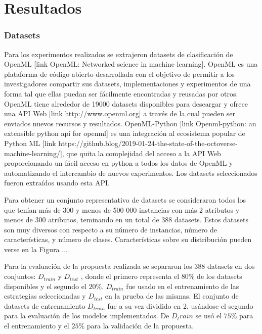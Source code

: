 \chapter{Resultados}\label{chapter:results}


\subsection{Datasets}

%
%
%

Para los experimentos realizados se extrajeron datasets de clasificación de OpenML [link OpenML: Networked science in machine learning]. OpenML es una plataforma de código abierto desarrollada con el objetivo de permitir a los investigadores compartir sus datasets, implementaciones y experimentos de una forma tal que ellas puedan ser fácilmente encontradas y reusadas por otros. OpenML tiene alrededor de 19000 datasets disponibles para descargar y ofrece una API Web [link http://www.openml.org] a través de la cual pueden ser enviados nuevos recursos y resultados. OpenML-Python [link Openml-python: an extensible python api for openml] es una integración al ecosistema popular de Python ML [link https://github.blog/2019-01-24-the-state-of-the-octoverse-machine-learning/], que quita la complejidad del acceso a la API Web proporcionando un fácil acceso en python a todos los datos de OpenML y automatizando el intercambio de nuevos experimentos. Los datasets seleccionados fueron extraídos usando esta API.
 
 Para obtener un conjunto representativo de datasets se consideraron todos los que tenían más de 300  y menos de 500 000 instancias con más 2 atributos y menos de 300 atributos, teminando en un total de 388 datasets. Estos datasets son muy diversos con respecto a su número de instancias, número de características, y número de clases. Características sobre su distribución pueden verse en la Figura ...
 
 Para la evaluación de la propuesta realizada se separaron los 388 datasets en dos conjuntos: $D_{train}$ y $D_{test}$ , donde el primero representa el $80\%$ de los datasets disponibles y el segundo el $20\%$. $D_{train}$ fue usado en el entrenamiento de las estrategias seleccionadas y $D_{test}$ en la prueba de las mismas. El conjunto de datasets de entrenamiento $D_{train}$ fue a su vez dividido en 2, usándose el segundo para la evaluación de los modelos implementados. De $D_train$ se usó el $75\%$ para el entrenamiento y el $25\%$ para la validación de la propuesta.
 
